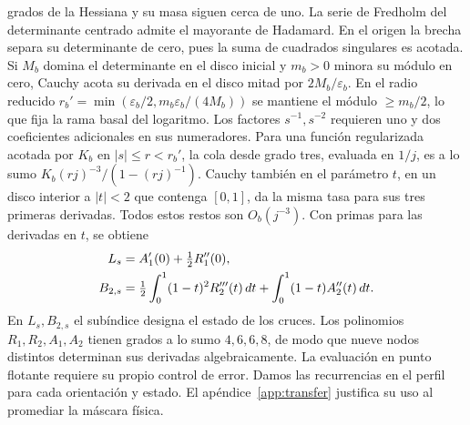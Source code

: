 grados de la Hessiana y su masa siguen cerca de uno. La serie de Fredholm del determinante
centrado admite el mayorante de Hadamard. En el origen la brecha separa su determinante de
cero, pues la suma de cuadrados singulares es acotada. Si \(M_b\) domina el determinante
en el disco inicial y \(m_b>0\) minora su módulo en cero, Cauchy acota su derivada
en el disco mitad por \(2M_b/\varepsilon_b\). En el radio reducido
\(r_b'=\min(\varepsilon_b/2,m_b\varepsilon_b/(4M_b))\) se mantiene el módulo
\(\ge m_b/2\), lo que fija la rama basal del logaritmo. Los factores \(s^{-1},s^{-2}\)
requieren uno y dos coeficientes adicionales en sus numeradores. Para una función regularizada
acotada por \(K_b\) en \(|s|\le r<r_b'\), la cola desde grado tres, evaluada en \(1/j\),
es a lo sumo \(K_b(rj)^{-3}/(1-(rj)^{-1})\). Cauchy también en el parámetro
\(t\), en un disco interior a \(|t|<2\) que contenga \([0,1]\), da la misma tasa para
sus tres primeras derivadas. Todos estos restos son \(O_b(j^{-3})\).
Con primas para las derivadas en \(t\), se obtiene
\begin{align}
 L_s&=A'_1(0)+\tfrac12R''_1(0),\notag\\
 B_{2,s}&=\tfrac12\int_0^1(1-t)^2R'''_2(t)\,dt+\int_0^1(1-t)A''_2(t)\,dt .\label{eq:estado-def}
\end{align}
En \(L_s,B_{2,s}\) el subíndice designa el estado de los cruces. Los polinomios
\(R_1,R_2,A_1,A_2\) tienen grados a lo sumo \(4,6,6,8\), de modo que nueve nodos distintos
determinan sus derivadas algebraicamente. La evaluación en punto flotante requiere su propio
control de error. Damos las recurrencias en el perfil para cada orientación y estado.
El apéndice~\ref{app:transfer} justifica su uso al promediar la máscara física.



